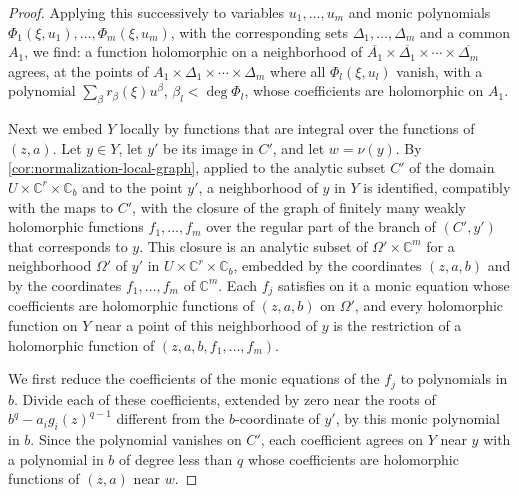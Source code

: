 \begin{proof}
Applying this successively to variables $u_1,\ldots,u_m$ and monic polynomials $\Phi_1(\xi,u_1),\ldots,\Phi_m(\xi,u_m)$, with the corresponding sets $\Delta_1,\ldots,\Delta_m$ and a common $A_1$, we find: a function holomorphic on a neighborhood of $\overline{A_1}\times\overline{\Delta_1}\times\cdots\times\overline{\Delta_m}$ agrees, at the points of $A_1\times\Delta_1\times\cdots\times\Delta_m$ where all $\Phi_l(\xi,u_l)$ vanish, with a polynomial $\sum_\beta r_\beta(\xi)u^\beta$, $\beta_l<\deg\Phi_l$, whose coefficients are holomorphic on $A_1$.

Next we embed $Y$ locally by functions that are integral over the functions of $(z,a)$. Let $y\in Y$, let $y'$ be its image in $C'$, and let $w=\nu(y)$. By \cref{cor:normalization-local-graph}, applied to the analytic subset $C'$ of the domain $U\times\mathbb C^r\times\mathbb C_b$ and to the point $y'$, a neighborhood of $y$ in $Y$ is identified, compatibly with the maps to $C'$, with the closure of the graph of finitely many weakly holomorphic functions $f_1,\ldots,f_m$ over the regular part of the branch of $(C',y')$ that corresponds to $y$. This closure is an analytic subset of $\Omega'\times\mathbb C^m$ for a neighborhood $\Omega'$ of $y'$ in $U\times\mathbb C^r\times\mathbb C_b$, embedded by the coordinates $(z,a,b)$ and by the coordinates $f_1,\ldots,f_m$ of $\mathbb C^m$. Each $f_j$ satisfies on it a monic equation whose coefficients are holomorphic functions of $(z,a,b)$ on $\Omega'$, and every holomorphic function on $Y$ near a point of this neighborhood of $y$ is the restriction of a holomorphic function of $(z,a,b,f_1,\ldots,f_m)$.

We first reduce the coefficients of the monic equations of the $f_j$ to polynomials in $b$. Divide each of these coefficients, extended by zero near the roots of $b^q-a_ig_i(z)^{q-1}$ different from the $b$-coordinate of $y'$, by this monic polynomial in $b$. Since the polynomial vanishes on $C'$, each coefficient agrees on $Y$ near $y$ with a polynomial in $b$ of degree less than $q$ whose coefficients are holomorphic functions of $(z,a)$ near $w$.


\end{proof}
